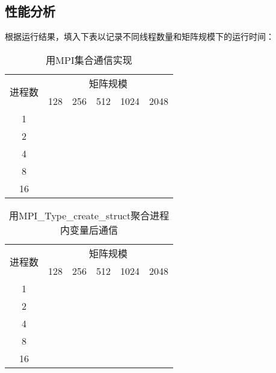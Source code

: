 \documentclass{SYSUReport}
\begin{document}
\subsection{性能分析}
根据运行结果，填入下表以记录不同线程数量和矩阵规模下的运行时间：
\begin{table}[H]
\centering
\caption{用MPI集合通信实现}
\label{表1}
\begin{tabular}{|c|lllll|}
\hline
\multirow{2}{*}{进程数} & \multicolumn{5}{c|}{矩阵规模}                                                                        \\ \cline{2-6} 
 & \multicolumn{1}{l|}{128} & \multicolumn{1}{l|}{256} & \multicolumn{1}{l|}{512} & \multicolumn{1}{l|}{1024} & 2048 \\ \hline
1                    & \multicolumn{1}{l|}{} & \multicolumn{1}{l|}{} & \multicolumn{1}{l|}{} & \multicolumn{1}{l|}{} &  \\ \hline
2                    & \multicolumn{1}{l|}{} & \multicolumn{1}{l|}{} & \multicolumn{1}{l|}{} & \multicolumn{1}{l|}{} &  \\ \hline
4                    & \multicolumn{1}{l|}{} & \multicolumn{1}{l|}{} & \multicolumn{1}{l|}{} & \multicolumn{1}{l|}{} &  \\ \hline
8                    & \multicolumn{1}{l|}{} & \multicolumn{1}{l|}{} & \multicolumn{1}{l|}{} & \multicolumn{1}{l|}{} &  \\ \hline
16                   & \multicolumn{1}{l|}{} & \multicolumn{1}{l|}{} & \multicolumn{1}{l|}{} & \multicolumn{1}{l|}{} &  \\ \hline
\end{tabular}
\end{table}

\begin{table}[H]
\centering
\caption{用MPI\_Type\_create\_struct聚合进程内变量后通信}
\label{表2}
\begin{tabular}{|c|lllll|}
\hline
\multirow{2}{*}{进程数} & \multicolumn{5}{c|}{矩阵规模}                                                                        \\ \cline{2-6} 
 & \multicolumn{1}{l|}{128} & \multicolumn{1}{l|}{256} & \multicolumn{1}{l|}{512} & \multicolumn{1}{l|}{1024} & 2048 \\ \hline
1                    & \multicolumn{1}{l|}{} & \multicolumn{1}{l|}{} & \multicolumn{1}{l|}{} & \multicolumn{1}{l|}{} &  \\ \hline
2                    & \multicolumn{1}{l|}{} & \multicolumn{1}{l|}{} & \multicolumn{1}{l|}{} & \multicolumn{1}{l|}{} &  \\ \hline
4                    & \multicolumn{1}{l|}{} & \multicolumn{1}{l|}{} & \multicolumn{1}{l|}{} & \multicolumn{1}{l|}{} &  \\ \hline
8                   & \multicolumn{1}{l|}{} & \multicolumn{1}{l|}{} & \multicolumn{1}{l|}{} & \multicolumn{1}{l|}{} &  \\ \hline
16                   & \multicolumn{1}{l|}{} & \multicolumn{1}{l|}{} & \multicolumn{1}{l|}{} & \multicolumn{1}{l|}{} &  \\ \hline
\end{tabular}
\end{table}
\end{document}
